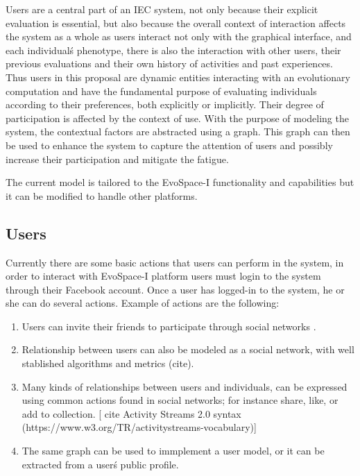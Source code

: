 \documentclass[conference]{IEEEtran}
\begin{document}
Users are a central part of an IEC system,  not only because their
explicit evaluation is essential, but also because the overall context of interaction
affects the system as a whole as users interact not only with the graphical
interface, and each individual\'s phenotype, there is also the interaction
with other users, their previous evaluations and their own history of activities
and past experiences. Thus users in this proposal are dynamic entities 
interacting with an evolutionary computation and
have the fundamental purpose of evaluating individuals according to their preferences,
both explicitly or implicitly. Their degree of participation is affected by 
the context of use. With the purpose of modeling the system, the contextual
factors are abstracted using a graph. This graph can then be used to 
enhance the system to capture the attention of users and possibly
increase their participation and mitigate the fatigue.

The current model is tailored to the EvoSpace-I functionality and capabilities
but it can be modified to handle other platforms. %


\subsection{Users} 

Currently there are some basic actions that
users can perform in the system, in order to interact with EvoSpace-I platform
users must login to the system through their Facebook account. 
Once a user has logged-in to the system, he or she can do several actions.
Example of actions are the following:

\begin{enumerate}
  \item  Users can invite their friends to participate through social networks . 

  \item Relationship between users can also be modeled as a social network,
  with well stablished algorithms and metrics (cite).

  \item Many kinds of relationships between users and individuals,
  can be expressed using common actions found in social networks;
  for instance share, like, or add to collection. [ cite Activity Streams 2.0
  syntax (https://www.w3.org/TR/activitystreams-vocabulary)]   

  \item The same graph can be used to immplement a user model, or it can
  be extracted from a user\'s public profile.

\end{enumerate}
\end{document}
